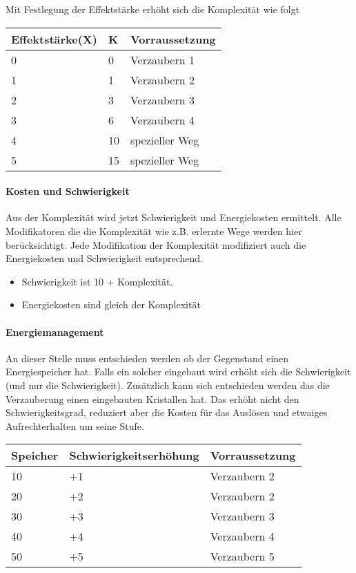 \documentclass{article}
\begin{document}
Mit Festlegung der Effektstärke erhöht sich die Komplexität wie folgt


\begin{small}
\begin{tabular}{|m{3cm}|m{1cm}|m{3cm}|}
\hline
\textbf{Effektstärke(X)}&\textbf{K}&\textbf{Vorraussetzung}\\
\hline
\hline
0&0&Verzaubern 1\\
\hline
1&1&Verzaubern 2\\
\hline
2&3&Verzaubern 3\\
\hline
3&6&Verzaubern 4\\
\hline
4&10&spezieller Weg\\
\hline
5&15&spezieller Weg\\
\hline
\end{tabular}
\end{small}

\paragraph{Kosten und Schwierigkeit}

Aus der Komplexität wird jetzt Schwierigkeit und Energiekosten ermittelt. Alle Modifikatoren die die Komplexität wie
z.B. erlernte Wege werden hier berücksichtigt. Jede Modifikation der Komplexität modifiziert auch die Energiekosten
und Schwierigkeit entsprechend.

\begin{itemize}
\item Schwierigkeit ist 10 + Komplexität.
\item Energiekosten sind gleich der Komplexität
\end{itemize}

\paragraph{Energiemanagement}

An dieser Stelle muss entschieden werden ob der Gegenstand einen Energiespeicher hat. Falls ein solcher eingebaut
wird erhöht sich die Schwierigkeit (und nur die Schwierigkeit). Zusätzlich kann sich entschieden werden das die
Verzauberung einen eingebauten Kristallen hat. Das erhöht nicht den Schwierigkeitsgrad, reduziert aber die Kosten für
das Auslösen und etwaiges Aufrechterhalten um seine Stufe.


\begin{small}
\begin{tabular}{|m{3cm}|m{4cm}|m{3cm}|}
\hline
\textbf{Speicher}&\textbf{Schwierigkeitserhöhung}&\textbf{Vorraussetzung}\\
\hline
\hline
10&+1&Verzaubern 2\\
\hline
20&+2&Verzaubern 2\\
\hline
30&+3&Verzaubern 3\\
\hline
40&+4&Verzaubern 4\\
\hline
50&+5&Verzaubern 5\\
\hline
\end{tabular}
\end{small}
\end{document}
